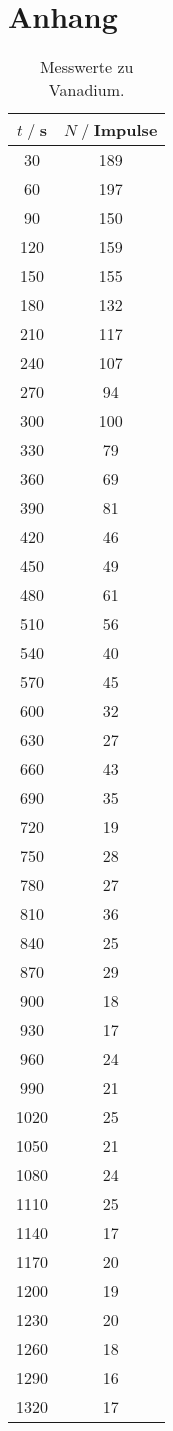 \newpage
\section{Anhang}
\begin{table}[H]
    \centering
    \begin{tabular}{c c}
        \toprule
        $t\;/\;$s&$N\;/\;$Impulse\\
        \midrule
        30&	    189\\
        60&	    197\\
        90&	    150\\
        120&	159\\
        150&    155\\
        180&	132\\
        210&	117\\
        240&	107\\
        270&	94\\
        300&	100\\
        330&	79\\
        360&	69\\
        390&	81\\
        420&	46\\
        450&	49\\
        480&	61\\
        510&	56\\
        540&	40\\
        570&	45\\
        600&	32\\
        630&	27\\
        660&	43\\
        690&	35\\
        720&	19\\
        750&	28\\
        780&	27\\
        810&	36\\
        840&	25\\
        870&	29\\
        900&	18\\
        930&	17\\
        960&	24\\
        990&	21\\
        1020&	25\\
        1050&	21\\
        1080&	24\\
        1110&	25\\
        1140&	17\\
        1170&	20\\
        1200&	19\\
        1230&	20\\
        1260&	18\\
        1290&	16\\
        1320&	17\\
        \bottomrule
    \end{tabular}
    \caption{Messwerte zu Vanadium.}
\end{table}

